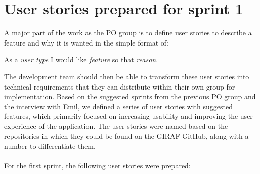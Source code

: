 \section{User stories prepared for sprint 1}\label{pre-sprint-1-user-stories}
A major part of the work as the PO group is to define user stories to describe a feature and why it is wanted in the simple format of:
\begin{center}
    As a \textit{user type} I would like \textit{feature} so that \textit{reason}.
\end{center}
The development team should then be able to transform these user stories into technical requirements that they can distribute within their own group for implementation.
Based on the suggested sprints from the previous PO group and the interview with Emil, we defined a series of user stories with suggested features, which primarily focused on increasing usability and improving the user experience of the application.
The user stories were named based on the repositories in which they could be found on the GIRAF GitHub, along with a number to differentiate them.
\\\\
For the first sprint, the following user stories were prepared:


